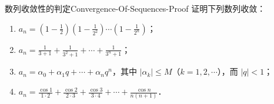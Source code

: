 \begin{problem}{数列收敛性的判定}{Convergence-Of-Sequences-Proof}
    证明下列数列收敛：
    \begin{enumerate}
        \item $a_n = \left( 1 - \frac{1}{2} \right) \left( 1 - \frac{1}{2^2} \right) \cdots \left( 1 - \frac{1}{2^n} \right)$；
        \item $a_n = \frac{1}{3+1} + \frac{1}{3^2+1} + \cdots + \frac{1}{3^n+1}$；
        \item $a_n = \alpha_0 + \alpha_1 q + \cdots + \alpha_n q^n$，其中 $|\alpha_k| \leqslant M$（$k = 1, 2, \cdots$），而 $|q| < 1$；
        \item $a_n = \frac{\cos 1}{1\cdot 2} + \frac{\cos 2}{2\cdot 3} + \frac{\cos 3}{3\cdot 4} + \cdots + \frac{\cos n}{n(n+1)}$．
    \end{enumerate}
\end{problem}

